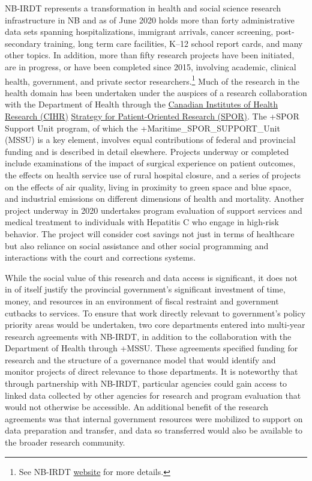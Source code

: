 \documentclass[
]{book}
\begin{document}
NB-IRDT represents a transformation in health and social science research infrastructure in NB and as of June 2020 holds more than forty administrative data sets spanning hospitalizations, immigrant arrivals, cancer screening, post-secondary training, long term care facilities, K--12 school report cards, and many other topics. In addition, more than fifty research projects have been initiated, are in progress, or have been completed since 2015, involving academic, clinical health, government, and private sector researchers.\footnote{See NB-IRDT \href{https://www.unb.ca/nbirdt/}{website} for more details.} Much of the research in the health domain has been undertaken under the auspices of a research collaboration with the Department of Health through the \href{https://cihr-irsc.gc.ca/e/45859.html}{Canadian Institutes of Health Research (CIHR)} \href{http://www.spor-maritime-srap.ca/}{Strategy for Patient-Oriented Research (SPOR)}. The +SPOR\textbar{} Support Unit program, of which the +Maritime\_SPOR\_SUPPORT\_Unit\textbar{} (MSSU) is a key element, involves equal contributions of federal and provincial funding and is described in detail elsewhere. Projects underway or completed include examinations of the impact of surgical experience on patient outcomes, the effects on health service use of rural hospital closure, and a series of projects on the effects of air quality, living in proximity to green space and blue space, and industrial emissions on different dimensions of health and mortality. Another project underway in 2020 undertakes program evaluation of support services and medical treatment to individuals with Hepatitis C who engage in high-risk behavior. The project will consider cost savings not just in terms of healthcare but also reliance on social assistance and other social programming and interactions with the court and corrections systems.

While the social value of this research and data access is significant, it does not in of itself justify the provincial government's significant investment of time, money, and resources in an environment of fiscal restraint and government cutbacks to services. To ensure that work directly relevant to government's policy priority areas would be undertaken, two core departments entered into multi-year research agreements with NB-IRDT, in addition to the collaboration with the Department of Health through +MSSU\textbar. These agreements specified funding for research and the structure of a governance model that would identify and monitor projects of direct relevance to those departments. It is noteworthy that through partnership with NB-IRDT, particular agencies could gain access to linked data collected by other agencies for research and program evaluation that would not otherwise be accessible. An additional benefit of the research agreements was that internal government resources were mobilized to support on data preparation and transfer, and data so transferred would also be available to the broader research community.
\end{document}
